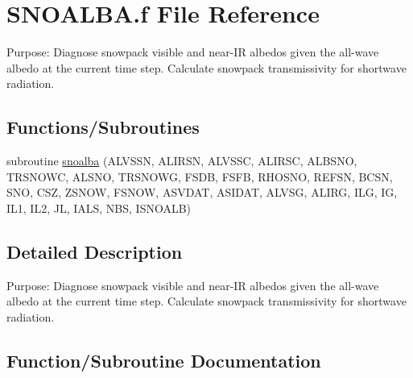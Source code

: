 \hypertarget{SNOALBA_8f}{}\section{S\+N\+O\+A\+L\+B\+A.\+f File Reference}
\label{SNOALBA_8f}


Purpose\+: Diagnose snowpack visible and near-\/\+I\+R albedos given the all-\/wave albedo at the current time step. Calculate snowpack transmissivity for shortwave radiation.  


\subsection*{Functions/\+Subroutines}
\begin{DoxyCompactItemize}
\item 
subroutine \hyperlink{SNOALBA_8f_a414a4eaf6a7d196c40633aa1c1ab2159}{snoalba} (A\+L\+V\+S\+S\+N, A\+L\+I\+R\+S\+N, A\+L\+V\+S\+S\+C, A\+L\+I\+R\+S\+C, A\+L\+B\+S\+N\+O, T\+R\+S\+N\+O\+W\+C, A\+L\+S\+N\+O, T\+R\+S\+N\+O\+W\+G, F\+S\+D\+B, F\+S\+F\+B, R\+H\+O\+S\+N\+O, R\+E\+F\+S\+N, B\+C\+S\+N, S\+N\+O, C\+S\+Z, Z\+S\+N\+O\+W, F\+S\+N\+O\+W, A\+S\+V\+D\+A\+T, A\+S\+I\+D\+A\+T, A\+L\+V\+S\+G, A\+L\+I\+R\+G, I\+L\+G, I\+G, I\+L1, I\+L2, J\+L, I\+A\+L\+S, N\+B\+S, I\+S\+N\+O\+A\+L\+B)
\end{DoxyCompactItemize}


\subsection{Detailed Description}
Purpose\+: Diagnose snowpack visible and near-\/\+I\+R albedos given the all-\/wave albedo at the current time step. Calculate snowpack transmissivity for shortwave radiation. 



\subsection{Function/\+Subroutine Documentation}
\hypertarget{SNOALBA_8f_a414a4eaf6a7d196c40633aa1c1ab2159}{}
